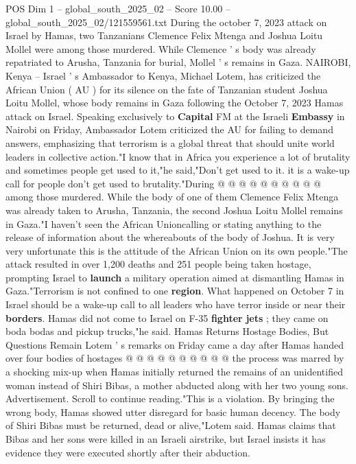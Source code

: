 \begin{textsample}{POS Dim 1 – global\_south\_2025\_02 – Score 10.00 – global\_south\_2025\_02/121559561.txt}  \label{ex:f1_pos_367}
During the october 7, 2023 attack on Israel by Hamas, two Tanzanians Clemence Felix Mtenga and Joshua Loitu Mollel were among those murdered.
While Clemence ' s body was already repatriated to Arusha, Tanzania for burial, Mollel ' s remains in Gaza.
NAIROBI, Kenya -- Israel ' s Ambassador to Kenya, Michael Lotem, has criticized the African Union ( AU ) for its silence on the fate of Tanzanian student Joshua Loitu Mollel, whose body remains in Gaza following the October 7, 2023 Hamas attack on Israel.
Speaking exclusively to \textbf{Capital} FM at the Israeli \textbf{Embassy} in Nairobi on Friday, Ambassador Lotem criticized the AU for failing to demand answers, emphasizing that terrorism is a global threat that should unite world leaders in collective action."I know that in Africa you experience a lot of brutality and sometimes people get used to it,"he said,"Don't get used to it. it is a wake-up call for people don't get used to brutality."During @ @ @ @ @ @ @ @ @ @ among those murdered.
While the body of one of them Clemence Felix Mtenga was already taken to Arusha, Tanzania, the second Joshua Loitu Mollel remains in Gaza."I haven't seen the African Unioncalling or stating anything to the release of information about the whereabouts of the body of Joshua.
It is very very unfortunate this is the attitude of the African Union on its own people."The attack resulted in over 1,200 deaths and 251 people being taken hostage, prompting Israel to \textbf{launch} a military operation aimed at dismantling Hamas in Gaza."Terrorism is not confined to one \textbf{region}.
What happened on October 7 in Israel should be a wake-up call to all leaders who have terror inside or near their \textbf{borders}.
Hamas did not come to Israel on F-35 \textbf{fighter} \textbf{jets} ; they came on boda bodas and pickup trucks,"he said.
Hamas Returns Hostage Bodies, But Questions Remain Lotem ' s remarks on Friday came a day after Hamas handed over four bodies of hostages @ @ @ @ @ @ @ @ @ @ the process was marred by a shocking mix-up when Hamas initially returned the remains of an unidentified woman instead of Shiri Bibas, a mother abducted along with her two young sons.
Advertisement.
Scroll to continue reading."This is a violation.
By bringing the wrong body, Hamas showed utter disregard for basic human decency.
The body of Shiri Bibas must be returned, dead or alive,"Lotem said.
Hamas claims that Bibas and her sons were killed in an Israeli airstrike, but Israel insists it has evidence they were executed shortly after their abduction.

\end{textsample}
